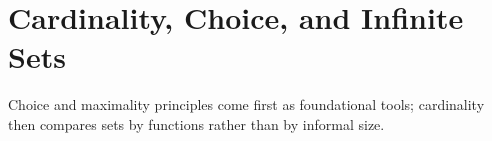\section{Cardinality, Choice, and Infinite Sets}

Choice and maximality principles come first as foundational tools; cardinality then compares sets by functions rather than by informal size.












